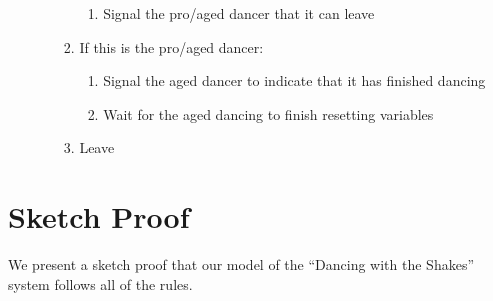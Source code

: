 \documentclass[12pt,a4paper]{scrartcl}
\begin{document}
\begin{enumerate}
\begin{enumerate}
\begin{enumerate}
\begin{enumerate}
                \item Signal the pro/aged dancer that it can leave
            \end{enumerate}
            \item If this is the pro/aged dancer:
            \begin{enumerate}
                \item Signal the aged dancer to indicate that it has finished dancing
                \item Wait for the aged dancing to finish resetting variables
            \end{enumerate}
            \item Leave
        \end{enumerate}
    \end{enumerate}
\end{enumerate}

\section{Sketch Proof}
We present a sketch proof that our model of the ``Dancing with the Shakes'' system follows all of the rules.
\end{document}
